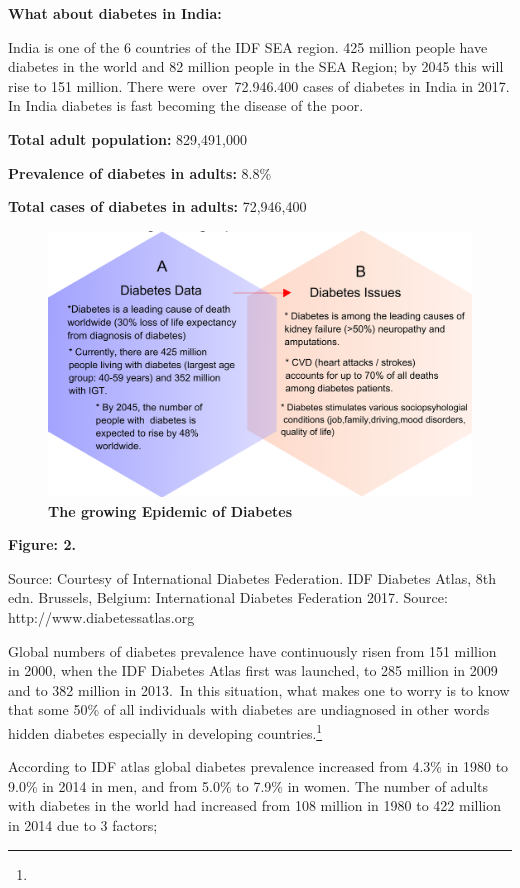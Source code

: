 \textbf{What about diabetes in India:}

India is one of the 6 countries of the IDF SEA region. 425 million people have diabetes in the world and 82 million people in the SEA Region; by 2045 this will rise to 151 million. There were over 72.946.400 cases of diabetes in India in 2017. In India diabetes is fast becoming the disease of the poor.

\textbf{Total adult population:} 829,491,000

\textbf{Prevalence of diabetes in adults:} 8.8\%

\textbf{Total cases of diabetes in adults:} 72,946,400

\begin{figure}
\caption{\textbf{The growing Epidemic of Diabetes}}
\includegraphics{images/035.jpg}
\end{figure}

\textbf{Figure: 2.}

Source: Courtesy of International Diabetes Federation. IDF Diabetes Atlas, 8th edn. Brussels, Belgium: International Diabetes Federation 2017. Source: http://www.diabetessatlas.org

Global numbers of diabetes prevalence have continuously risen from 151 million in 2000, when the IDF Diabetes Atlas first was launched, to 285 million in 2009 and to 382 million in 2013. In this situation, what makes one to worry is to know that some 50\% of all individuals with diabetes are undiagnosed in other words hidden diabetes especially in developing countries.\footnote{}

According to IDF atlas global diabetes prevalence increased from 4.3\% in 1980 to 9.0\% in 2014 in men, and from 5.0\% to 7.9\% in women. The number of adults with diabetes in the world had increased from 108 million in 1980 to 422 million in 2014 due to 3 factors;

